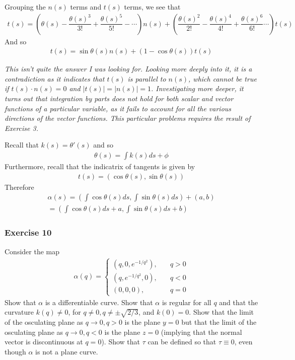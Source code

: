 \documentclass{article}
\begin{document}
	Grouping the $n(s)$ terms and $t(s)$ terms, we see that
	\begin{gather*}
		t(s) = \left( \theta(s) - \dfrac{\theta(s)^3}{3!} + \dfrac{\theta(s)^5}{5!} - \cdots \right) n(s) + \left( \dfrac{\theta(s)^2}{2!} - \dfrac{\theta(s)^4}{4!} + \dfrac{\theta(s)^6}{6!} \cdots \right) t(s)
	\end{gather*}
	And so
	\begin{gather*}
		t(s) = \sin \theta(s) n(s) + \left( 1 - \cos \theta(s) \right) t(s)
	\end{gather*}
	
	\textit{This isn't quite the answer I was looking for. Looking more deeply into it, it is a contradiction as it indicates that $t(s)$ is parallel to $n(s)$, which cannot be true if $t(s) \cdot n(s) = 0$ and $|t(s)| = |n(s)| = 1$. Investigating more deeper, it turns out that integration by parts does not hold for both scalar and vector functions of a particular variable, as it fails to account for all the various directions of the vector functions. This particular problems requires the result of Exercise 3. }
	
	Recall that $k(s) = \theta'(s)$ and so
	\begin{gather*}
		\theta(s) = \int k(s) ds + \phi
	\end{gather*}
	Furthermore, recall that the indicatrix of tangents is given by
	\begin{gather*}
		t(s) = \left( \cos \theta(s), \sin \theta(s) \right)
	\end{gather*}
	Therefore
	\begin{gather*}
		\alpha(s) = \left( \int \cos \theta(s) ds, \int \sin \theta(s) ds \right) + (a, b) \\
		= \left( \int \cos \theta(s) ds + a, \int \sin \theta(s) ds + b \right)
	\end{gather*}
	
	\subsubsection*{Exercise 10}
	Consider the map
	\begin{align*}
		\alpha(q) = \begin{cases}
			\left( q, 0, e^{-1/q^2} \right), \quad &q > 0 \\
			\left( q, e^{-1/q^2}, 0 \right), \quad &q < 0 \\
			\left( 0, 0, 0 \right), \quad &q = 0
		\end{cases}
	\end{align*}
	Show that $\alpha$ is a differentiable curve. Show that $\alpha$ is regular for all $q$ and that the curvature $k(q) \neq 0$, for $q \neq 0, q \neq \pm \sqrt{2/3}$, and $k(0) = 0$. Show that the limit of the osculating plane as $q \to 0, q > 0$ is the plane $y = 0$ but that the limit of the osculating plane as $q \to 0, q < 0$ is the plane $z = 0$ (implying that the normal vector is discontinuous at $q = 0$). Show that $\tau$ can be defined so that $\tau \equiv 0$, even though $\alpha$ is not a plane curve.
\end{document}

